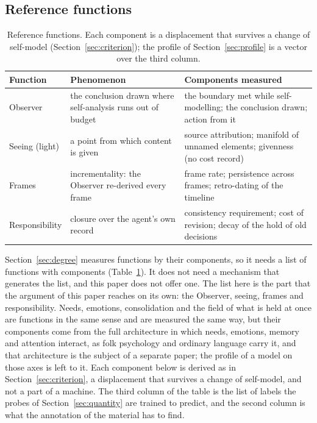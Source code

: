 \subsection{Reference functions}
\label{sec:reference}

\begin{table}[t]
\centering\small
\begin{tabular}{@{}p{2.5cm}p{5cm}p{7cm}@{}}
\toprule
Function & Phenomenon & Components measured \\
\midrule
Observer & the conclusion drawn where self-analysis runs out of budget & the boundary met while self-modelling; the conclusion drawn; action from it \\
Seeing (light) & a point from which content is given & source attribution; manifold of unnamed elements; givenness (no cost record) \\
Frames & incrementality: the Observer re-derived every frame & frame rate; persistence across frames; retro-dating of the timeline \\
Responsibility & closure over the agent's own record & consistency requirement; cost of revision; decay of the hold of old decisions \\
\bottomrule
\end{tabular}
\caption{Reference functions. Each component is a displacement that survives a change of self-model
(Section~\ref{sec:criterion}); the profile of Section~\ref{sec:profile} is a vector over the third
column.}
\label{tab:functions}
\end{table}

Section~\ref{sec:degree} measures functions by their components, so it needs a list of functions with
components (Table~\ref{tab:functions}). It does not need a mechanism that generates the list, and this
paper does not offer one. The list here is the part that the argument of this paper reaches on its
own: the Observer, seeing, frames and responsibility. Needs, emotions, consolidation and the field of
what is held at once are functions in the same sense and are measured the same way, but their
components come from the full architecture in which needs, emotions, memory and attention interact,
as folk psychology and ordinary language carry it, and that architecture is the subject of a separate
paper; the profile of a model on those axes is left to it. Each component below is derived as in
Section~\ref{sec:criterion}, a displacement that survives a change of self-model, and not a part of a
machine. The third column of the table is the list of labels the probes of Section~\ref{sec:quantity}
are trained to predict, and the second column is what the annotation of the material has to find.

